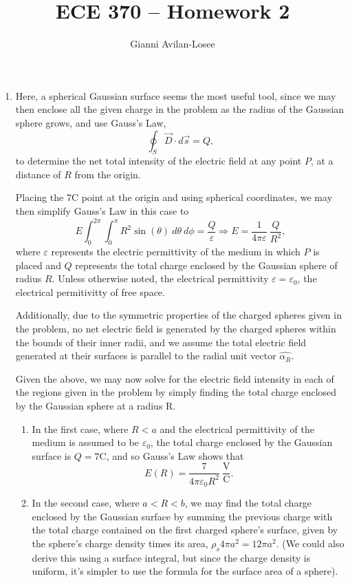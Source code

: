 \documentclass{article}
\title{ECE 370 -- Homework 2}
\author{Gianni Avilan-Losee}
\begin{document}

\begin{enumerate}
	\item Here, a spherical Gaussian surface seems the most useful tool, since we may then enclose all the given charge in the problem as the radius of the Gaussian sphere grows, and use Gauss's Law, \[
	  \oint_{S}\vec{D} \cdot d \vec{s} = Q,
	\]
  to determine the net total intensity of the electric field at any point \(P\), at a distance of \(R\) from the origin.

	Placing the \(7\mathrm{C}\) point at the origin and using spherical coordinates, we may then simplify Gauss's Law in this case to \[
		E \int_{0}^{2\pi}\int_{0}^{\pi} R^2 \sin{(\theta)} \ d\theta \ d\phi = \frac{Q}{\varepsilon} \Rightarrow E = \frac{1}{4\pi\varepsilon} \ \frac{Q}{R^2}, 
	\]
	where \(\varepsilon\) represents the electric permittivity of the medium in which \(P\) is placed and \(Q\) represents the total charge enclosed by the Gaussian sphere of radius \(R\). Unless otherwise noted, the electrical permittivity \(\varepsilon = \varepsilon_{0}\), the electrical permitivitty of free space. 

	Additionally, due to the symmetric properties of the charged spheres given in the problem, no net electric field is generated by the charged spheres within the bounds of their inner radii, and we assume the total electric field generated at their surfaces is parallel to the radial unit vector \(\hat{\alpha_R}\).

	Given the above, we may now solve for the electric field intensity in each of the regions given in the problem by simply finding the total charge enclosed by the Gaussian sphere at a radius R. 
	\begin{enumerate}[label=\alph*)]
		\item In the first case, where \(R < a\) and the electrical permittivity of the medium is assumed to be \(\varepsilon_{0}\), the total charge enclosed by the Gaussian surface is \(Q = 7\mathrm{C}\), and so Gauss's Law shows that \[
				E(R) = \frac{7}{4\pi\varepsilon_{0}R^2} \ \mathrm{\frac{V}{C}}.
		\]
	\item In the second case, where \(a < R < b\), we may find the total charge enclosed by the Gaussian surface by summing the previous charge with the total charge contained on the first charged sphere's surface, given by the sphere's charge density times its area, \(\rho_{s} 4\pi a^2 = 12\pi a^2\). (We could also derive this using a surface integral, but since the charge density is uniform, it's simpler to use the formula for the surface area of a sphere).


\end{enumerate}
\end{enumerate}
\end{document}
